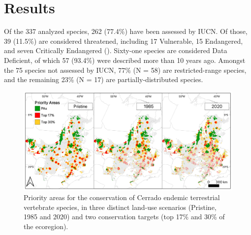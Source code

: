 \documentclass[12pt,openright,oneside,a4paper,english]{abntex2}
\begin{document}


\section{Results}

Of the 337 analyzed species, 262 (77.4\%) have been assessed by IUCN. Of those, 39 (11.5\%) are considered threatened, including 17 Vulnerable, 15 Endangered, and seven Critically Endangered (). Sixty-one species are considered Data Deficient, of which 57 (93.4\%) were described more than 10 years ago. Amongst the 75 species not assessed by IUCN, 77\% (N = 58) are restricted-range species, and the remaining 23\% (N = 17) are partially-distributed species.

\begin{figure}[htb]
	\centering
	\includegraphics[width=160mm]{Fig c3-1}
	\caption[Priority areas for the conservation of Cerrado’s endemic terrestrial vertebrates]{\small Priority areas for the conservation of Cerrado endemic terrestrial vertebrate species, in three distinct land-use scenarios (Pristine, 1985 and 2020) and two conservation targets (top 17\% and 30\% of the ecoregion).}
	\label{fig:fig3-1}
\end{figure}
\end{document}

